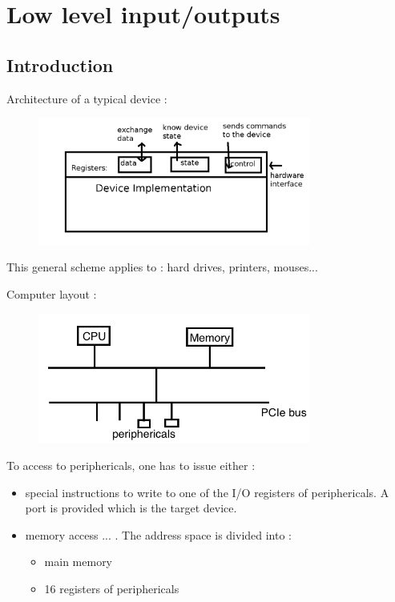 \chapter{Low level input/outputs}
\section{Introduction}

Architecture of a typical device :

\begin{figure}[h!]
  \begin{center}
    \includegraphics[width=0.8\textwidth]{architecture_device.png}
    \label{Architecture of a typical device}
  \end{center}
\end{figure}
This general scheme applies to : hard drives, printers, mouses...


Computer layout :
\begin{figure}[h!]
  \begin{center}
    \includegraphics[width=0.8\textwidth]{computer_layout.png}
    \label{fig:io1}
  \end{center}
\end{figure}

To access to periphericals, one has to issue either :

\begin{itemize}
  \item special instructions to write to one of the I/O registers of periphericals.
  A port is provided which is the target device.
  
  \item memory access ... . The address space is divided into :
  \begin{itemize}
    \item  main memory
    \item 16 registers of periphericals
  \end{itemize}
\end{itemize}

